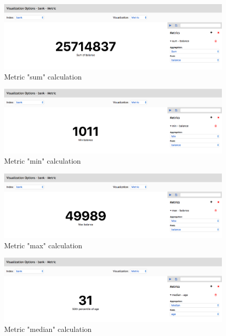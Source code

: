 \documentclass[a4paper, 12pt, english]{book}
\begin{document}
\begin{figure}
  \centering
  \includegraphics[width=13cm, keepaspectratio]{img/metric-sum-calculation.png}
  \caption{Metric "sum" calculation}
  \label{fig:metric-sum-calcuation}
\end{figure}

\begin{figure}
  \centering
  \includegraphics[width=13cm, keepaspectratio]{img/metric-min-calculation.png}
  \caption{Metric "min" calculation}
  \label{fig:metric-min-calcuation}
\end{figure}

\begin{figure}
  \centering
  \includegraphics[width=13cm, keepaspectratio]{img/metric-max-calculation.png}
  \caption{Metric "max" calculation}
  \label{fig:metric-max-calcuation}
\end{figure}

\begin{figure}
  \centering
  \includegraphics[width=13cm, keepaspectratio]{img/metric-median-calculation.png}
  \caption{Metric "median" calculation}
  \label{fig:metric-median-calcuation}
\end{figure}
\end{document}
